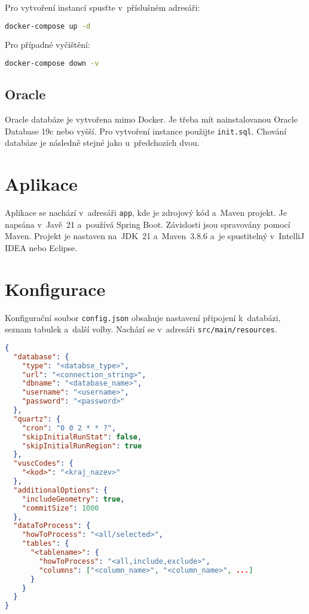 Pro vytvoření instancí spusťte v~příslušném adresáři:
\begin{lstlisting}[language=bash]
docker-compose up -d
\end{lstlisting}

Pro případné vyčištění:
\begin{lstlisting}[language=bash]
docker-compose down -v
\end{lstlisting}

\subsection*{Oracle}
Oracle databáze je vytvořena mimo Docker. Je třeba mít nainstalovanou Oracle Database 19c nebo vyšší. Pro vytvoření instance použijte \texttt{init.sql}.
Chování databáze je následně stejné jako u~předchozích dvou.

\section*{Aplikace}
Aplikace se nachází v~adresáři \texttt{app}, kde je zdrojový kód a~Maven projekt. Je napsána v~Javě~21 a~používá Spring Boot. Závislosti jsou spravovány pomocí Maven.
Projekt je nastaven na~JDK~21 a~Maven~3.8.6 a~je spustitelný v~IntelliJ IDEA nebo Eclipse.

\section*{Konfigurace}
Konfigurační soubor \texttt{config.json} obsahuje nastavení připojení k~databázi, seznam tabulek a~další volby. Nachází se v~adresáři \texttt{src/main/resources}.

\newpage

\begin{lstlisting}[language=json, caption={Příklad konfiguračního souboru}]
{
  "database": {
    "type": "<databse_type>",
    "url": "<connection_string>",
    "dbname": "<database_name>",
    "username": "<username>",
    "password": "<password>"
  },
  "quartz": {
    "cron": "0 0 2 * * ?",
    "skipInitialRunStat": false,
    "skipInitialRunRegion": true
  },
  "vuscCodes": {
    "<kod>": "<kraj_nazev>"
  },
  "additionalOptions": {
    "includeGeometry": true,
    "commitSize": 1000
  },
  "dataToProcess": {
    "howToProcess": "<all/selected>",
    "tables": {
      "<tablename>": {
        "howToProcess": "<all,include,exclude>",
        "columns": ["<column_name>", "<column_name>", ...]
      }
    }
  }
}
\end{lstlisting}

